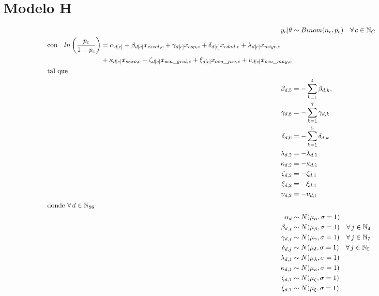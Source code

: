 \section{Modelo H}

\begin{align}\label{eq:Modelo_Comp_H}
y_c|\theta & \sim Binom(n_c,p_c) \quad \forall \, c \in \mathbb{N}_C \nonumber \\
\begin{split}
\text{con} \quad ln\left(\dfrac{p_c}{1-p_c}\right) &= \alpha_{d[c]} + \beta_{d[c]} x_{escol,c} + \gamma_{d[c]} x_{csp,c} + \delta_{d[c]} x_{edad,c} + \lambda_{d[c]} x_{migr,c} \\
&+ \kappa_{d[c]} x_{sexo,c} + \zeta_{d[c]} x_{ocu\_gral,c} + \xi_{d[c]} x_{ocu\_juv,c} + \upsilon_{d[c]} x_{ocu\_may,c} 
\end{split}\\
\intertext{tal que} 
\beta_{d,5} &= -\sum\limits_{k = 1}^{4} \beta_{d,k}, \nonumber \\
\gamma_{d,8} &= -\sum\limits_{k = 1}^{7} \gamma_{d,k} \nonumber \\
\delta_{d,6} &= -\sum\limits_{k = 1}^{5} \delta_{d,k} \nonumber \\
\lambda_{d,2} &= -\lambda_{d,1} \nonumber \\
\kappa_{d,2} &= -\kappa_{d,1} \nonumber \\
\zeta_{d,2} &= -\zeta_{d,1} \nonumber \\
\xi_{d,2} &= -\xi_{d,1} \nonumber \\
\upsilon_{d,2} &= -\upsilon_{d,1} \nonumber \\
\intertext{donde $\forall \, d \in \mathbb{N}_{96}$}
\alpha_d &\sim N(\mu_{\alpha}, \sigma=1) \quad  \nonumber \\
\beta_{d,j} &\sim N(\mu_{\beta}, \sigma=1) \quad \forall \, j \in \mathbb{N}_{4} \nonumber \\
\gamma_{d,j} &\sim N(\mu_{\gamma}, \sigma=1) \quad \forall \, j \in \mathbb{N}_{7} \nonumber \\
\delta_{d,j} &\sim N(\mu_{\delta}, \sigma=1) \quad \forall \, j \in \mathbb{N}_{5}  \nonumber \\ 
\lambda_{d,1} &\sim N(\mu_{\lambda}, \sigma=1) \nonumber \\
\kappa_{d,1} &\sim N(\mu_{\kappa}, \sigma=1) \nonumber \\ 
\zeta_{d,1} &\sim N(\mu_{\zeta}, \sigma=1) \nonumber \\
\xi_{d,1} &\sim N(\mu_{\xi}, \sigma=1) \nonumber \\

\end{align}
